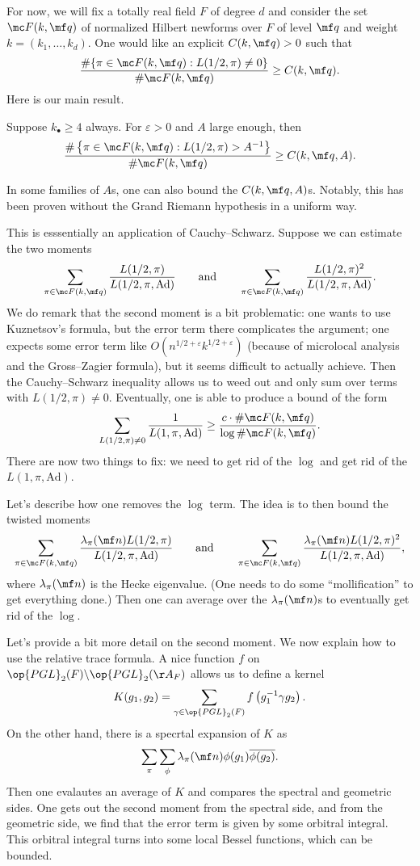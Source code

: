 \documentclass{article}
\begin{document}
For now, we will fix a totally real field $F$ of degree $d$ and consider the set $\mc F(k,\mf q)$ of normalized Hilbert newforms over $F$ of level $\mf q$ and weight $k=(k_1,\ldots,k_d)$. One would like an explicit $C(k,\mf q)>0$ such that
\[\frac{\#\{\pi\in\mc F(k,\mf q):L(1/2,\pi)\ne0\}}{\#\mc F(k,\mf q)}\ge C(k,\mf q).\]
Here is our main result.
\begin{theorem}
	Suppose $k_\bullet\ge4$ always. For $\varepsilon>0$ and $A$ large enough, then
	\[\frac{\#\left\{\pi\in\mc F(k,\mf q):L(1/2,\pi)>A^{-1}\right\}}{\#\mc F(k,\mf q)}\ge C(k,\mf q,A).\]
\end{theorem}
In some families of $A$s, one can also bound the $C(k,\mf q,A)$s. Notably, this has been proven without the Grand Riemann hypothesis in a uniform way.

This is esssentially an application of Cauchy--Schwarz. Suppose we can estimate the two moments
\[\sum_{\pi\in\mc F(k,\mf q)}\frac{L(1/2,\pi)}{L(1/2,\pi,\mathrm{Ad})}\qquad\text{and}\qquad\sum_{\pi\in\mc F(k,\mf q)}\frac{L(1/2,\pi)^2}{L(1/2,\pi,\mathrm{Ad})}.\]
We do remark that the second moment is a bit problematic: one wants to use Kuznetsov's formula, but the error term there complicates the argument; one expects some error term like $O\left(n^{1/2+\varepsilon}k^{1/2+\varepsilon}\right)$ (because of microlocal analysis and the Gross--Zagier formula), but it seems difficult to actually achieve. Then the Cauchy--Schwarz inequality allows us to weed out and only sum over terms with $L(1/2,\pi)\ne0$. Eventually, one is able to produce a bound of the form
\[\sum_{L(1/2,\pi)\ne0}\frac1{L(1,\pi,\mathrm{Ad})}\ge\frac{c\cdot\#\mc F(k,\mf q)}{\log\#\mc F(k,\mf q)}.\]
There are now two things to fix: we need to get rid of the $\log$ and get rid of the $L(1,\pi,\mathrm{Ad})$.

Let's describe how one removes the $\log$ term. The idea is to then bound the twisted moments
\[\sum_{\pi\in\mc F(k,\mf q)}\frac{\lambda_\pi(\mf n)L(1/2,\pi)}{L(1/2,\pi,\mathrm{Ad})}\qquad\text{and}\qquad\sum_{\pi\in\mc F(k,\mf q)}\frac{\lambda_\pi(\mf n)L(1/2,\pi)^2}{L(1/2,\pi,\mathrm{Ad})},\]
where $\lambda_\pi(\mf n)$ is the Hecke eigenvalue. (One needs to do some ``mollification'' to get everything done.) Then one can average over the $\lambda_\pi(\mf n)$s to eventually get rid of the $\log$.

Let's provide a bit more detail on the second moment. We now explain how to use the relative trace formula. A nice function $f$ on $\op{PGL}_2(F)\backslash\op{PGL}_2(\AA_F)$ allows us to define a kernel
\[K(g_1,g_2)=\sum_{\gamma\in\op{PGL}_2(F)}f\left(g_1^{-1}\gamma g_2\right).\]
On the other hand, there is a specrtal expansion of $K$ as
\[\sum_\pi\sum_\phi\lambda_\pi(\mf n)\phi(g_1)\overline{\phi(g_2)}.\]
Then one evalautes an average of $K$ and compares the spectral and geometric sides. One gets out the second moment from the spectral side, and from the geometric side, we find that the error term is given by some orbitral integral. This orbitral integral turns into some local Bessel functions, which can be bounded.
\end{document}
